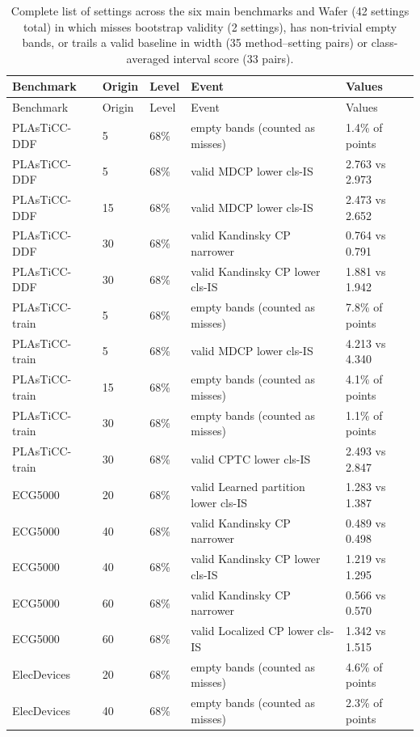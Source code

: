 \begingroup
\scriptsize
\begin{longtable}{lllll}
\caption{Complete list of settings across the six main benchmarks and Wafer (42 settings total) in which \gamut{} misses bootstrap validity (2 settings), has non-trivial empty bands, or trails a valid baseline in width (35 method--setting pairs) or class-averaged interval score (33 pairs).}
\label{tab:unfavourable}\\
\toprule
Benchmark & Origin & Level & Event & Values \\
\midrule
\endfirsthead
\toprule
Benchmark & Origin & Level & Event & Values \\
\midrule
\endhead
PLAsTiCC-DDF & 5 & 68\% & \gamut{} empty bands (counted as misses) & 1.4\% of points \\
PLAsTiCC-DDF & 5 & 68\% & valid MDCP lower cls-IS & 2.763 vs 2.973 \\
PLAsTiCC-DDF & 15 & 68\% & valid MDCP lower cls-IS & 2.473 vs 2.652 \\
PLAsTiCC-DDF & 30 & 68\% & valid Kandinsky CP narrower & 0.764 vs 0.791 \\
PLAsTiCC-DDF & 30 & 68\% & valid Kandinsky CP lower cls-IS & 1.881 vs 1.942 \\
PLAsTiCC-train & 5 & 68\% & \gamut{} empty bands (counted as misses) & 7.8\% of points \\
PLAsTiCC-train & 5 & 68\% & valid MDCP lower cls-IS & 4.213 vs 4.340 \\
PLAsTiCC-train & 15 & 68\% & \gamut{} empty bands (counted as misses) & 4.1\% of points \\
PLAsTiCC-train & 30 & 68\% & \gamut{} empty bands (counted as misses) & 1.1\% of points \\
PLAsTiCC-train & 30 & 68\% & valid CPTC lower cls-IS & 2.493 vs 2.847 \\
ECG5000 & 20 & 68\% & valid Learned partition lower cls-IS & 1.283 vs 1.387 \\
ECG5000 & 40 & 68\% & valid Kandinsky CP narrower & 0.489 vs 0.498 \\
ECG5000 & 40 & 68\% & valid Kandinsky CP lower cls-IS & 1.219 vs 1.295 \\
ECG5000 & 60 & 68\% & valid Kandinsky CP narrower & 0.566 vs 0.570 \\
ECG5000 & 60 & 68\% & valid Localized CP lower cls-IS & 1.342 vs 1.515 \\
ElecDevices & 20 & 68\% & \gamut{} empty bands (counted as misses) & 4.6\% of points \\
ElecDevices & 40 & 68\% & \gamut{} empty bands (counted as misses) & 2.3\% of points \\

\end{longtable}
